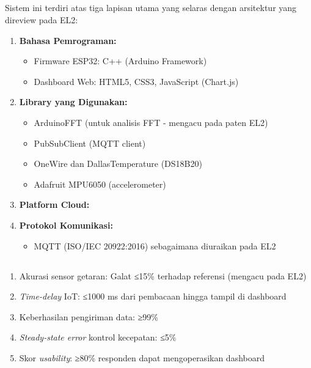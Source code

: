 \documentclass{elsinta}
\begin{document}
\subsection{\SoftwareSpecTitle}

Sistem ini terdiri atas tiga lapisan utama yang selaras dengan arsitektur yang direview pada EL2:

\begin{enumerate}
    \item \textbf{Bahasa Pemrograman:}
    \begin{itemize}
        \item Firmware ESP32: C++ (Arduino Framework)
        \item Dashboard Web: HTML5, CSS3, JavaScript (Chart.js)
    \end{itemize}
    
    \item \textbf{Library yang Digunakan:}
    \begin{itemize}
        \item ArduinoFFT (untuk analisis FFT - mengacu pada paten EL2)
        \item PubSubClient (MQTT client)
        \item OneWire dan DallasTemperature (DS18B20)
        \item Adafruit MPU6050 (accelerometer)
    \end{itemize}
    
    \item \textbf{Platform Cloud:}
    \begin{itemize}
       
    \end{itemize}
    
    \item \textbf{Protokol Komunikasi:}
    \begin{itemize}
        \item MQTT (ISO/IEC 20922:2016) sebagaimana diuraikan pada EL2
    \end{itemize}
\end{enumerate}

\subsection{\PerformanceCriteriaTitle}

\begin{enumerate}
    \item Akurasi sensor getaran: Galat ≤15\% terhadap referensi (mengacu pada EL2)
    \item \textit{Time-delay} IoT: ≤1000 ms dari pembacaan hingga tampil di dashboard
    \item Keberhasilan pengiriman data: ≥99\%
    \item \textit{Steady-state error} kontrol kecepatan: ≤5\%
    \item Skor \textit{usability}: ≥80\% responden dapat mengoperasikan dashboard
\end{enumerate}
\end{document}
